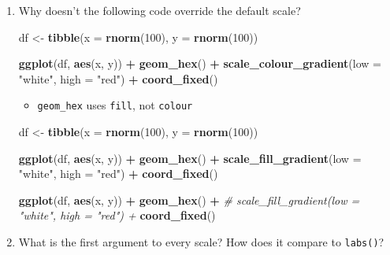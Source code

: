 \documentclass[]{book}
\newenvironment{Shaded}{\begin{snugshade}}{\end{snugshade}}
\newcommand{\CommentTok}[1]{\textcolor[rgb]{0.56,0.35,0.01}{\textit{#1}}}
\newcommand{\DataTypeTok}[1]{\textcolor[rgb]{0.13,0.29,0.53}{#1}}
\newcommand{\DecValTok}[1]{\textcolor[rgb]{0.00,0.00,0.81}{#1}}
\newcommand{\KeywordTok}[1]{\textcolor[rgb]{0.13,0.29,0.53}{\textbf{#1}}}
\newcommand{\NormalTok}[1]{#1}
\newcommand{\OperatorTok}[1]{\textcolor[rgb]{0.81,0.36,0.00}{\textbf{#1}}}
\newcommand{\StringTok}[1]{\textcolor[rgb]{0.31,0.60,0.02}{#1}}
\providecommand{\tightlist}{%
  \setlength{\itemsep}{0pt}\setlength{\parskip}{0pt}}
\theoremstyle{definition}
\theoremstyle{definition}
\theoremstyle{definition}
\theoremstyle{remark}
\begin{document}
\begin{enumerate}
\def\labelenumi{\arabic{enumi}.}
\item
  Why doesn't the following code override the default scale?

\begin{Shaded}
\begin{Highlighting}[]
\NormalTok{df <-}\StringTok{ }\KeywordTok{tibble}\NormalTok{(}\DataTypeTok{x =} \KeywordTok{rnorm}\NormalTok{(}\DecValTok{100}\NormalTok{), }\DataTypeTok{y =} \KeywordTok{rnorm}\NormalTok{(}\DecValTok{100}\NormalTok{))}

\KeywordTok{ggplot}\NormalTok{(df, }\KeywordTok{aes}\NormalTok{(x, y)) }\OperatorTok{+}
\StringTok{  }\KeywordTok{geom_hex}\NormalTok{() }\OperatorTok{+}
\StringTok{  }\KeywordTok{scale_colour_gradient}\NormalTok{(}\DataTypeTok{low =} \StringTok{"white"}\NormalTok{, }\DataTypeTok{high =} \StringTok{"red"}\NormalTok{) }\OperatorTok{+}
\StringTok{  }\KeywordTok{coord_fixed}\NormalTok{()}
\end{Highlighting}
\end{Shaded}

  \begin{itemize}
  \tightlist
  \item
    \texttt{geom\_hex} uses \texttt{fill}, not \texttt{colour}
  \end{itemize}

\begin{Shaded}
\begin{Highlighting}[]
\NormalTok{df <-}\StringTok{ }\KeywordTok{tibble}\NormalTok{(}\DataTypeTok{x =} \KeywordTok{rnorm}\NormalTok{(}\DecValTok{100}\NormalTok{), }\DataTypeTok{y =} \KeywordTok{rnorm}\NormalTok{(}\DecValTok{100}\NormalTok{))}

\KeywordTok{ggplot}\NormalTok{(df, }\KeywordTok{aes}\NormalTok{(x, y)) }\OperatorTok{+}
\StringTok{  }\KeywordTok{geom_hex}\NormalTok{() }\OperatorTok{+}
\StringTok{  }\KeywordTok{scale_fill_gradient}\NormalTok{(}\DataTypeTok{low =} \StringTok{"white"}\NormalTok{, }\DataTypeTok{high =} \StringTok{"red"}\NormalTok{) }\OperatorTok{+}
\StringTok{  }\KeywordTok{coord_fixed}\NormalTok{()}
\end{Highlighting}
\end{Shaded}

\begin{Shaded}
\begin{Highlighting}[]
\KeywordTok{ggplot}\NormalTok{(df, }\KeywordTok{aes}\NormalTok{(x, y)) }\OperatorTok{+}
\StringTok{  }\KeywordTok{geom_hex}\NormalTok{() }\OperatorTok{+}
\StringTok{  }\CommentTok{# scale_fill_gradient(low = "white", high = "red") +}
\StringTok{  }\KeywordTok{coord_fixed}\NormalTok{()}
\end{Highlighting}
\end{Shaded}
\item
  What is the first argument to every scale? How does it compare to
  \texttt{labs()}?


\end{enumerate}
\end{document}
